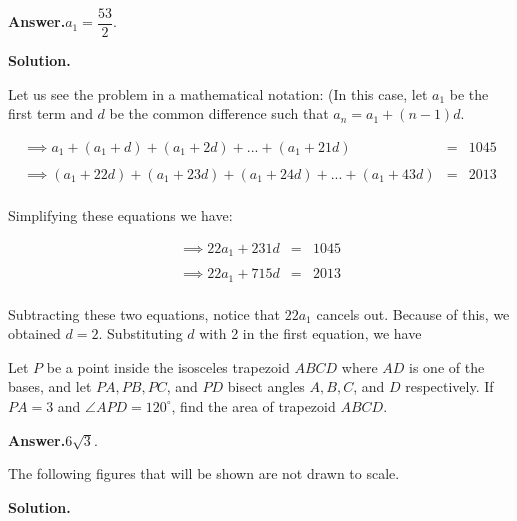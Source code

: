 \documentclass[12pt,paper=letter]{scrartcl}
\newcommand{\ans}[1]{{\sffamily \bfseries Answer.}\;\(\boxed{\text{#1}}\).}
\newcommand{\sol}{{\sffamily \bfseries Solution.}\;}
\newenvironment{rem}%
{\noindent \ignorespaces \small \sffamily \sansmath {\bfseries Remark.}}%
{\ignorespacesafterend}
\begin{document}
\ans{$a_1 = \dfrac{53}{2}$}

\sol 

Let us see the problem in a mathematical notation: (In this case, let $a_1$ be the first term and $d$ be the common difference such that $a_n = a_1 + (n-1)d.$

\begin{equation*}
    \begin{array}{lll}
         \implies a_1 + (a_1 +d) + (a_1 +2d) + ... + (a_1 +21d) & = & 1045\\
         \\
         \implies (a_1 + 22d) + (a_1 + 23d) + (a_1 +24d) + ... + (a_1 +43d) & = & 2013\\
    \end{array}
\end{equation*}

Simplifying these equations we have:

\begin{equation*}
    \begin{array}{lll}
         \implies 22a_1 + 231d & = & 1045\\
         \\
         \implies 22a_1 + 715d & = & 2013\\
    \end{array}
\end{equation*}

Subtracting these two equations, notice that $22a_1$ cancels out. Because of this, we obtained $d= 2$. Substituting $d$ with 2 in the first equation, we have 

\newpage



\begin{probboxed}
Let $P$ be a point inside the isosceles trapezoid $ABCD$ where $AD$ is one of the bases, and let $P A, P B, P C$, and $P D$ bisect angles $A, B, C$, and $D$ respectively. If $PA=3$ and $\angle APD = 120 ^{\circ}$, find
the area of trapezoid $ABCD.$

\end{probboxed}

\ans{$6\sqrt{3}$}

\begin{rem}
The following figures that will be shown are not drawn to scale. 
\end{rem}

\sol
\end{document}
